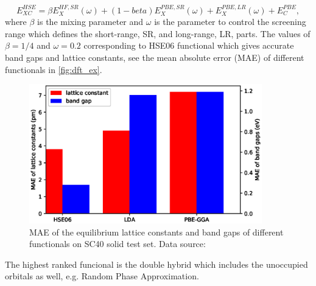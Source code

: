 \begin{equation}
E_{XC}^{HSE}=\beta E_X^{HF,SR}(\omega)+(1-beta)E_X^{PBE,SR}(\omega)+E_X^{PBE,LR}(\omega)+E_C^{PBE},
\end{equation}
where $\beta$ is the mixing parameter and $\omega$ is the parameter to control the screening range which defines the short-range, SR, and long-range, LR, parts. The values of $\beta=1/4$ and $\omega=0.2$ corresponding to HSE06 functional which gives accurate band gaps and lattice constants, see the mean absolute error (MAE) of different functionals in \autoref{fig:dft_ex}. 
\begin{figure}[htbp!] 
\centering  
\includegraphics[width=0.9\textwidth]{lat_ex.eps}
\caption[MAE of the equilibrium lattice constants and band gaps of different functionals]{ MAE of the equilibrium lattice constants and band gaps of different functionals on SC40 solid test set\protect\footnotemark[1]. Data source: \cite{Lucero2012}}  
\label{fig:dft_ex}
\end{figure} 
The highest ranked funcional is the double hybrid which includes the unoccupied orbitals as well, e.g. Random Phase Approximation\cite{Langreth1980}. 
